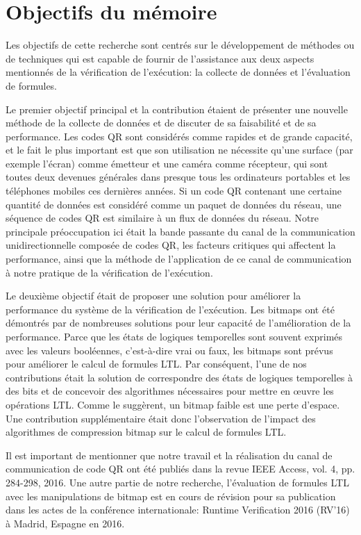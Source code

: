 \section{Objectifs du mémoire}

Les objectifs de cette recherche sont centrés sur le développement de méthodes ou de techniques qui est capable de fournir de l'assistance aux deux aspects mentionnés de la vérification de l'exécution: la collecte de données et l'évaluation de formules.

Le premier objectif principal et la contribution étaient de présenter une nouvelle méthode de la collecte de données et de discuter de sa faisabilité et de sa performance. Les codes QR sont considérés comme rapides et de grande capacité, et le fait le plus important est que son utilisation ne nécessite qu'une surface (par exemple l'écran) comme émetteur et une caméra comme récepteur, qui sont toutes deux devenues générales dans presque tous les ordinateurs portables et les téléphones mobiles ces dernières années. Si un code QR contenant une certaine quantité de données est considéré comme un paquet de données du réseau, une séquence de codes QR est similaire à un flux de données du réseau. Notre principale préoccupation ici était la bande passante du canal de la communication unidirectionnelle composée de codes QR, les facteurs critiques qui affectent la performance, ainsi que la méthode de l'application de ce canal de communication à notre pratique de la vérification de l'exécution.

Le deuxième objectif était de proposer une solution pour améliorer la performance du système de la vérification de l'exécution. Les bitmaps ont été démontrés par de nombreuses solutions pour leur capacité de l'amélioration de la performance. Parce que les états de logiques temporelles sont souvent exprimés avec les valeurs booléennes, c'est-à-dire vrai ou faux, les bitmaps sont prévus pour améliorer le calcul de formules LTL. Par conséquent, l'une de nos contributions était la solution de correspondre des états de logiques temporelles à des bits et de concevoir des algorithmes nécessaires pour mettre en \oe{}uvre les opérations LTL. Comme \cite{lemire2014} le suggèrent, un bitmap faible est une perte d'espace. Une contribution supplémentaire était donc l'observation de l'impact des algorithmes de compression bitmap sur le calcul de formules LTL.

Il est important de mentionner que notre travail et la réalisation du canal de communication de code QR ont été publiés dans la revue IEEE Access, vol. 4, pp. 284-298, 2016. Une autre partie de notre recherche, l'évaluation de formules LTL avec les manipulations de bitmap est en cours de révision pour sa publication dans les actes de la conférence internationale: Runtime Verification 2016 (RV'16) à Madrid, Espagne en 2016.

